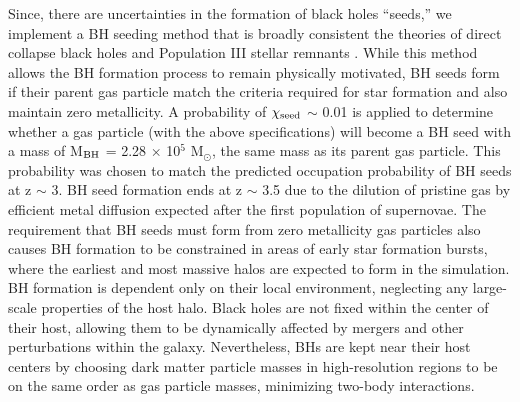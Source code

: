 \documentclass[12pt,headA,chapB]{fiskthesis}
\begin{document}
Since, there are uncertainties in the formation of black holes ``seeds,'' we implement a BH seeding method that is broadly consistent the theories of direct collapse black holes \citep{Couchman1986, Abel2002, Bromm2004} and Population III stellar remnants \citep{Loeb1994, Eisenstein1995, Koushiappas2004, Begelman2006, Lodato2006}. While this method allows the BH formation process to remain physically motivated, BH seeds form if their parent gas particle match the criteria required for star formation and also maintain zero metallicity. \citep{Stinson2006} A probability of $\chi_{\rm seed}$ $\sim$ 0.01 is applied to determine whether a gas particle (with the above specifications) will become a BH seed with a mass of M$_{\rm BH}$ = 2.28 $\times$ 10$^5$ M$_{\odot}$, the same mass as its parent gas particle. This probability was chosen to match the predicted occupation probability of BH seeds at z $\sim$ 3. \citep{Volonteri2008} 
BH seed formation ends at z $\sim$ 3.5 due to the dilution of pristine gas by efficient metal diffusion expected after the first population of supernovae. The requirement that BH seeds must form from zero metallicity gas particles also causes BH formation to be constrained in areas of early star formation bursts, where the earliest and most massive halos are expected to form in the simulation. BH formation is dependent only on their local environment, neglecting any large-scale properties of the host halo. Black holes are not fixed within the center of their host, allowing them to be dynamically affected by mergers and other perturbations within the galaxy. Nevertheless, BHs are kept near their host centers by choosing dark matter particle masses in high-resolution regions to be on the same order as gas particle masses, minimizing two-body interactions. \citep{Bellovary2010,Zolotov2012}
\end{document}

